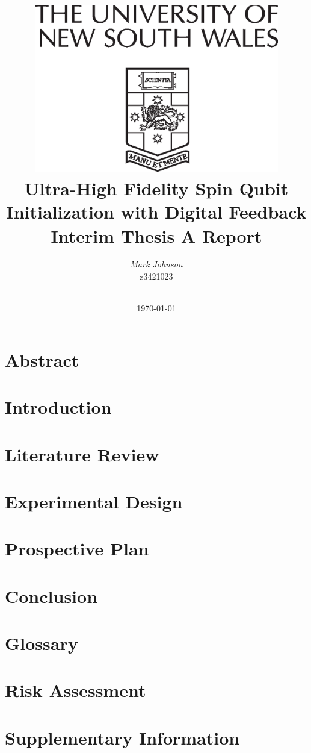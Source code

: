\documentclass[a4paper, english, twoside, 12pt]{article}
\title{
	\centering\includegraphics[width=0.8\textwidth]{Arms-vl}\\
	\vspace{1cm}
	\Huge \textbf{Ultra-High Fidelity Spin Qubit Initialization with Digital Feedback}\\
	\vspace{1cm}
    \huge Interim Thesis A Report
	}
\author{\Huge \emph{Mark Johnson}\\
        \Large z3421023 \\\\ 
        }
\date{\today} %
\begin{document}
%
%

\thispagestyle{empty}

\pagebreak


\listoftodos

\pagebreak

\tableofcontents
\listoffigures
\listoftables

\pagebreak

\section{Abstract}

\pagebreak
\section{Introduction}

\pagebreak
\section{Literature Review}

\pagebreak
\section{Experimental Design}

\pagebreak
\section{Prospective Plan}

\pagebreak
\section{Conclusion}

\pagebreak


\begin{appendices} 
	\section{Glossary}
	\printglossaries
	\section{Risk Assessment}
%	
	\section{Supplementary Information}
	
\end{appendices}
\end{document}
